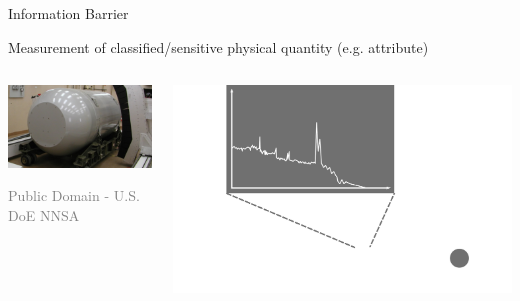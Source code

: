 \documentclass[presentation]{beamer}
\begin{document}
\begin{frame}[label=sec-4-2]{Information Barrier}
\begin{center}
Measurement of classified/sensitive physical quantity (e.g. attribute)\\[1.5em]
\end{center}

\begin{columns}
\begin{column}{0.48\textwidth}
\begin{varblock}[\textwidth]{}
    \includegraphics[width=\textwidth]{images/2013-09-30_na22_3_topline.png}
\end{varblock}
\vspace{-0.3cm}
    \tiny \textcolor{gray}{Public Domain - U.S. DoE NNSA}
\end{column}



\begin{column}{0.48\textwidth}
\includegraphics[width=\textwidth]{images/ib/ib_classified}
\end{column}
\end{columns}
\end{frame}
\end{document}
